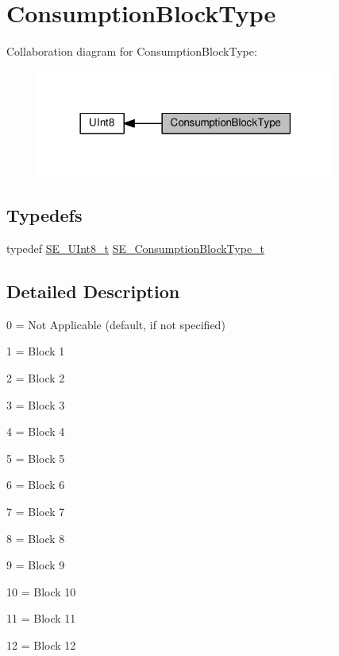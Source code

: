 \hypertarget{group__ConsumptionBlockType}{}\section{Consumption\+Block\+Type}
\label{group__ConsumptionBlockType}
Collaboration diagram for Consumption\+Block\+Type\+:\nopagebreak
\begin{figure}[H]
\begin{center}
\leavevmode
\includegraphics[width=278pt]{group__ConsumptionBlockType}
\end{center}
\end{figure}
\subsection*{Typedefs}
\begin{DoxyCompactItemize}
\item 
typedef \hyperlink{group__UInt8_gaf7c365a1acfe204e3a67c16ed44572f5}{S\+E\+\_\+\+U\+Int8\+\_\+t} \hyperlink{group__ConsumptionBlockType_ga526f797922e4c3009d50c28f457c462e}{S\+E\+\_\+\+Consumption\+Block\+Type\+\_\+t}
\end{DoxyCompactItemize}


\subsection{Detailed Description}
0 = Not Applicable (default, if not specified)

1 = Block 1

2 = Block 2

3 = Block 3

4 = Block 4

5 = Block 5

6 = Block 6

7 = Block 7

8 = Block 8

9 = Block 9

10 = Block 10

11 = Block 11

12 = Block 12

